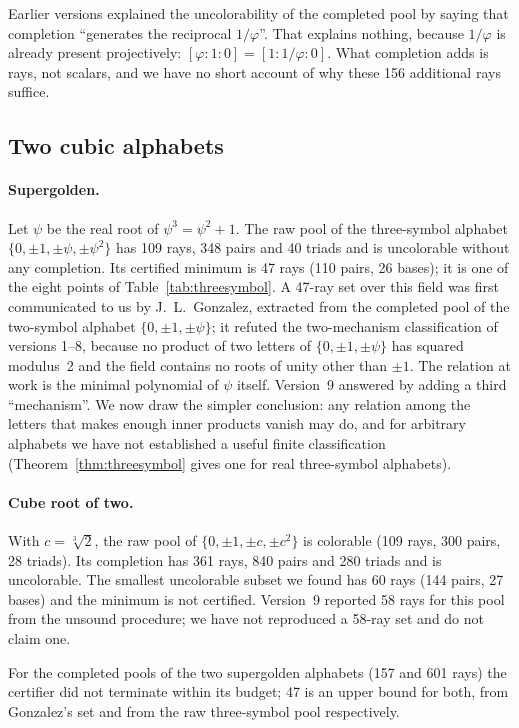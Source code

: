 Earlier versions explained the uncolorability of the completed pool by saying that completion
``generates the reciprocal $1/\varphi$''.  That explains nothing, because $1/\varphi$ is already
present projectively: $[\varphi:1:0]=[1:1/\varphi:0]$.  What completion adds is rays, not
scalars, and we have no short account of why these 156 additional rays suffice.

\subsection{Two cubic alphabets}

\paragraph{Supergolden.}  Let $\psi$ be the real root of $\psi^3=\psi^2+1$.  The raw pool of the
three-symbol alphabet $\{0,\pm1,\pm\psi,\pm\psi^2\}$ has 109 rays, 348 pairs and 40 triads and is
uncolorable without any completion.  Its certified minimum is 47 rays (110 pairs, 26 bases); it
is one of the eight points of Table~\ref{tab:threesymbol}.  A
47-ray set over this field was first communicated to us by J.~L.~Gonzalez, extracted from the
completed pool of the two-symbol alphabet $\{0,\pm1,\pm\psi\}$; it refuted the two-mechanism
classification of versions 1--8, because no product of two letters of $\{0,\pm1,\pm\psi\}$ has squared
modulus~2 and the field contains no roots of unity other than $\pm1$.  The relation at work is
the minimal polynomial of $\psi$ itself.  Version~9 answered by adding a third ``mechanism''.  We
now draw the simpler conclusion: any relation among the letters that makes enough inner products
vanish may do, and for arbitrary alphabets we have not established a useful finite
classification (Theorem~\ref{thm:threesymbol} gives one for real three-symbol alphabets).

\paragraph{Cube root of two.}  With $c=\sqrt[3]2$, the raw pool of $\{0,\pm1,\pm c,\pm c^2\}$ is
colorable (109 rays, 300 pairs, 28 triads).  Its completion has 361 rays, 840 pairs and 280 triads and is
uncolorable.  The smallest uncolorable subset we found has 60 rays (144 pairs, 27 bases) and the
minimum is not certified.  Version~9 reported 58 rays for this pool from the unsound procedure;
we have not reproduced a 58-ray set and do not claim one.

For the completed pools of the two supergolden alphabets (157 and 601 rays) the certifier did not
terminate within its budget; 47 is an upper bound for both, from Gonzalez's set and from the raw
three-symbol pool respectively.


